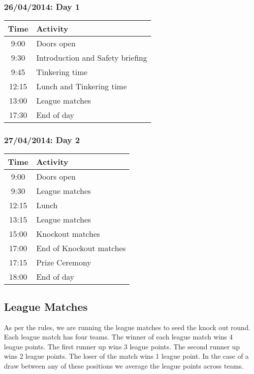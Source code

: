 \documentclass[12pt]{article}
\begin{document}
\begin{center}
    \subsubsection{26/04/2014: Day 1}

    \begin{tabular}{|c|l|}
        \hline
        Time & Activity \\ \hline
        9:00 & Doors open \\ \hline
        9:30 & Introduction and Safety briefing \\ \hline
        9:45 & Tinkering time \\ \hline
        12:15 & Lunch and Tinkering time \\ \hline
        13:00 & League matches \\ \hline
        17:30 & End of day \\ \hline
    \end{tabular}

    \subsubsection{27/04/2014: Day 2}

    \begin{tabular}{|c|l|}
        \hline
        Time & Activity \\ \hline
        9:00 & Doors open \\ \hline
        9:30 & League matches \\ \hline
        12:15 & Lunch \\ \hline
        13:15 & League matches \\ \hline
        15:00 & Knockout matches \\ \hline
        17:00 & End of Knockout matches \\ \hline
        17:15 & Prize Ceremony \\ \hline
        18:00 & End of day \\ \hline
    \end{tabular}
\end{center}

\subsection{League Matches}

As per the rules, we are running the league matches to seed the knock out
round. Each league match has four teams. The winner of each league match wins 4
league points. The first runner up wins 3 league points. The second runner up
wins 2 league points. The loser of the match wins 1 league point. In the case
of a draw between any of these positions we average the league points across
teams.
\end{document}
